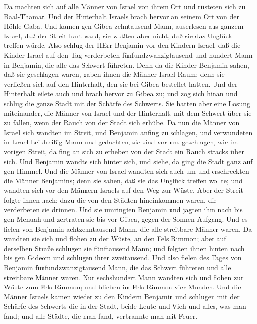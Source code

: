  Da machten sich auf alle Männer von Israel von ihrem Ort
und rüsteten sich zu Baal-Thamar. Und der Hinterhalt Israels brach
hervor an seinem Ort von der Höhle Gaba.  Und kamen gen
Gibea zehntausend Mann, auserlesen aus ganzem Israel, daß der Streit
hart ward; sie wußten aber nicht, daß sie das Unglück treffen würde.
 Also schlug der HErr Benjamin vor den Kindern Israel, daß
die Kinder Israel auf den Tag verderbeten fünfundzwanzigtausend und
hundert Mann in Benjamin, die alle das Schwert führeten. 
Denn da die Kinder Benjamin sahen, daß sie geschlagen waren, gaben ihnen
die Männer Israel Raum; denn sie verließen sich auf den Hinterhalt, den
sie bei Gibea bestellet hatten.  Und der Hinterhalt eilete
auch und brach hervor zu Gibea zu; und zog sich hinan und schlug die
ganze Stadt mit der Schärfe des Schwerts.  Sie hatten aber
eine Losung miteinander, die Männer von Israel und der Hinterhalt, mit
dem Schwert über sie zu fallen, wenn der Rauch von der Stadt sich
erhübe.  Da nun die Männer von Israel sich wandten im
Streit, und Benjamin anfing zu schlagen, und verwundeten in Israel bei
dreißig Mann und gedachten, sie sind vor uns geschlagen, wie im vorigen
Streit,  da fing an sich zu erheben von der Stadt ein Rauch
stracks über sich. Und Benjamin wandte sich hinter sich, und siehe, da
ging die Stadt ganz auf gen Himmel.  Und die Männer von
Israel wandten sich auch um und erschreckten die Männer Benjamins; denn
sie sahen, daß sie das Unglück treffen wollte;  und wandten
sich vor den Männern Israels auf den Weg zur Wüste. Aber der Streit
folgte ihnen nach; dazu die von den Städten hineinkommen waren, die
verderbeten sie drinnen.  Und sie umringten Benjamin und
jagten ihm nach bis gen Menuah und zertraten sie bis vor Gibea, gegen
der Sonnen Aufgang.  Und es fielen von Benjamin
achtzehntausend Mann, die alle streitbare Männer waren.  Da
wandten sie sich und flohen zu der Wüste, an den Fels Rimmon; aber auf
derselben Straße schlugen sie fünftausend Mann; und folgten ihnen hinten
nach bis gen Gideom und schlugen ihrer zweitausend.  Und
also fielen des Tages von Benjamin fünfundzwanzigtausend Mann, die das
Schwert führeten und alle streitbare Männer waren.  Nur
sechshundert Mann wandten sich und flohen zur Wüste zum Fels Rimmon; und
blieben im Fels Rimmon vier Monden.  Und die Männer Israels
kamen wieder zu den Kindern Benjamin und schlugen mit der Schärfe des
Schwerts die in der Stadt, beide Leute und Vieh und alles, was man fand;
und alle Städte, die man fand, verbrannte man mit Feuer.

